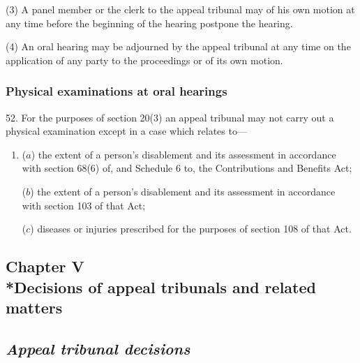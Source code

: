 \documentclass[12pt,a4paper]{article}
\begin{document}
(3) A panel member or the clerk to the appeal tribunal may of his own motion at any time before the beginning of the hearing postpone the hearing.

(4) An oral hearing may be adjourned by the appeal tribunal at any time on the application of any party to the proceedings or of its own motion.



\subsubsection[52. Physical examinations at oral hearings]{Physical examinations at oral hearings}

52.  For the purposes of section 20(3) an appeal tribunal may not carry out a physical examination except in a case which relates to—
\begin{enumerate}\item[]
($a$) the extent of a person’s disablement and its assessment in accordance with section 68(6) of, and Schedule 6 to, the Contributions and Benefits Act;

($b$) the extent of a person’s disablement and its assessment in accordance with section 103 of that Act;

($c$) diseases or injuries prescribed for the purposes of section 108 of that Act.
\end{enumerate}

\subsection[Chapter V --- Decisions of appeal tribunals and related matters]{Chapter V\\*Decisions of appeal tribunals and related matters}

\subsection{\itshape Appeal tribunal decisions}
\end{document}
